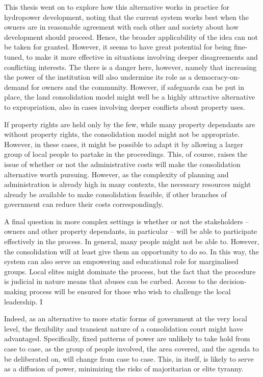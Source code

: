 This thesis went on to explore how this alternative works in practice for hydropower development, noting that the current system works best when the owners are in reasonable agreement with each other and society about how development should proceed. Hence, the broader applicability of the idea can not be taken for granted. However, it seems to have great potential for being fine-tuned, to make it more effective in situations involving deeper disagreements and conflicting interests. The there is a danger here, however, namely that increasing the power of the institution will also undermine its role as a democracy-on-demand for owners and the community. However, if safeguards can be put in place, the land consolidation model might well be a highly attractive alternative to expropriation, also in cases involving deeper conflicts about property uses.

If property rights are held only by the few, while many property dependants are without property rights, the consolidation model might not be appropriate. However, in these cases, it might be possible to adapt it by allowing a larger group of local people to partake in the proceedings. This, of course, raises the issue of whether or not the administrative costs will make the consolidation alternative worth pursuing. However, as the complexity of planning and administration is already high in many contexts, the necessary resources might already be available to make consolidation feasible, if other branches of government can reduce their costs correspondingly. 

A final question in more complex settings is whether or not the stakeholders -- owners and other property dependants, in particular -- will be able to participate effectively in the process. In general, many people might not be able to. However, the consolidation will at least give them an opportunity to do so. In this way, the system can also serve an empowering and educational role for marginalised groups. Local elites might dominate the process, but the fact that the procedure is judicial in nature means that abuses can be curbed. Access to the decision-making process will be ensured for those who wish to challenge the local leadership. I

Indeed, as an alternative to more static forms of government at the very local level, the flexibility and transient nature of a consolidation court might have advantaged. Specifically, fixed patterns of power are unlikely to take hold from case to case, as the group of people involved, the area covered, and the agenda to be deliberated on, will change from case to case. This, in itself, is likely to serve as a diffusion of power, minimizing the risks of majoritarian or elite tyranny.

